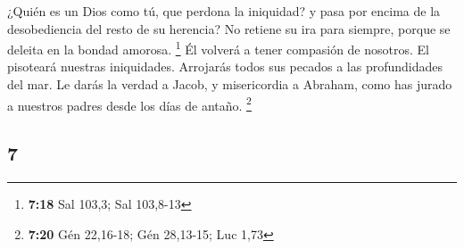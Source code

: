 \begin{paracol}{2}
 ¿Quién es un Dios como tú, que perdona la iniquidad? y
pasa por encima de la desobediencia del resto de su herencia? No retiene
su ira para siempre, porque se deleita en la bondad amorosa. \footnote{\textbf{7:18}
  Sal 103,3; Sal 103,8-13}  Él volverá a tener compasión
de nosotros. El pisoteará nuestras iniquidades. Arrojarás todos sus
pecados a las profundidades del mar.  Le darás la verdad
a Jacob, y misericordia a Abraham, como has jurado a nuestros padres
desde los días de antaño. \footnote{\textbf{7:20} Gén 22,16-18; Gén
  28,13-15; Luc 1,73} \switchcolumn
\begin{otherlanguage}{english}

\hypertarget{section-13}{%
\section{7}\label{section-13}}


\end{otherlanguage}
\end{paracol}
